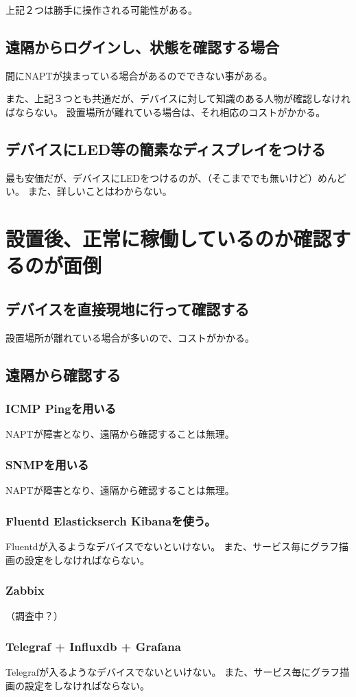 上記２つは勝手に操作される可能性がある。

\subsection{遠隔からログインし、状態を確認する場合}
間にNAPTが挟まっている場合があるのでできない事がある。

また、上記３つとも共通だが、デバイスに対して知識のある人物が確認しなければならない。
設置場所が離れている場合は、それ相応のコストがかかる。
\subsection{デバイスにLED等の簡素なディスプレイをつける}
最も安価だが、デバイスにLEDをつけるのが、（そこまででも無いけど）めんどい。
また、詳しいことはわからない。


\section{設置後、正常に稼働しているのか確認するのが面倒}
\subsection{デバイスを直接現地に行って確認する}
設置場所が離れている場合が多いので、コストがかかる。
\subsection{遠隔から確認する}
\subsubsection{ICMP Pingを用いる}
NAPTが障害となり、遠隔から確認することは無理。
\subsubsection{SNMPを用いる}
NAPTが障害となり、遠隔から確認することは無理。
\subsubsection{Fluentd Elastickserch Kibanaを使う。}
Fluentdが入るようなデバイスでないといけない。
また、サービス毎にグラフ描画の設定をしなければならない。
\subsubsection{Zabbix}
（調査中？）
\subsubsection{Telegraf + Influxdb + Grafana}
Telegrafが入るようなデバイスでないといけない。
また、サービス毎にグラフ描画の設定をしなければならない。
